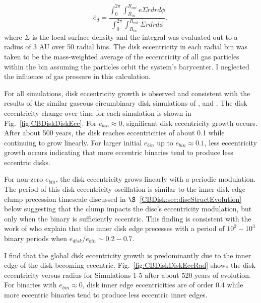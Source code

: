 \begin{equation}
\bar{e}_d = \frac{\int_0^{2 \pi} \int^{R_{out}}_{R_{in}} e \Sigma r dr d\phi }{\int_0^{2 \pi} \int^{R_{out}}_{R_{in}} \Sigma r dr d\phi},
\end{equation}
where $\Sigma$ is the local surface density and the integral was
evaluated out to a radius of 3 AU over 50 radial bins.  The disk eccentricity in each radial bin was taken to be the mass-weighted average of the eccentricity of all gas particles within the bin assuming the particles orbit the system's barycenter.  I neglected the influence of gas pressure in this calculation.

For all simulations, disk eccentricity growth is observed and consistent with the results
of the similar gaseous circumbinary disk simulations of \citet{Kley2008}, \citet{Pierens2007,Pierens2013} and \citet{Farris2014}.  The disk eccentricity 
change over time for each simulation is shown in Fig.~\ref{fig:CBDiskDiskEcc}. For $e_{bin} \approx 0$, significant disk eccentricity growth occurs.  
After about 500 years, the disk reaches eccentricities of about 0.1 while continuing to grow linearly.  For larger initial $e_{bin}$ up 
to $e_{bin} \approx 0.1$, less eccentricity growth occurs indicating that more eccentric binaries tend to produce less eccentric disks.

For non-zero $e_{bin}$, the disk eccentricity grows linearly with a
periodic modulation.  The period of this disk eccentricity oscillation
is similar to the inner disk edge clump precession timescale discussed
in $\S$~\ref{CBDisk:sec:discStructEvolution} below suggesting that the clump impacts the disc's eccentricity modulation, but only when the binary is sufficiently eccentric.  This finding is consistent with the work of \citet{Artymowicz2000} who explain that the inner disk edge precesses with a period of $10^2 - 10^3$ binary periods when $e_{disk}/e_{bin} \sim 0.2-0.7$.  

I find that the global disk eccentricity growth is predominantly due to the inner edge of the disk becoming eccentric.  Fig.~\ref{fig:CBDiskDiskEccRad} shows the disk eccentricity versus radius for Simulations 1-5 after about 520 years of evolution.  For binaries with $e_{bin} \approx 0$, disk inner edge eccentricities are of order 0.4 while more eccentric binaries tend to produce less eccentric inner edges.


